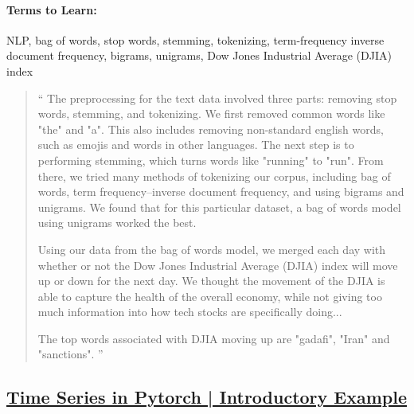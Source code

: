 \paragraph*{Terms to Learn: } NLP, bag of words, stop words, stemming, tokenizing, term-frequency inverse document frequency, bigrams, unigrams, Dow Jones Industrial Average (DJIA) index

\begin{quotation}
	`` The preprocessing for the text data involved three parts: removing stop words, stemming, and tokenizing. We first removed common words like "the" and "a". This also includes removing non-standard english words, such as emojis and words in other languages. The next step is to performing stemming, which turns words like "running" to "run". From there, we tried many methods of tokenizing our corpus, including bag of words, term frequency–inverse document frequency, and using bigrams and unigrams. We found that for this particular dataset, a bag of words model using unigrams worked the best.

	Using our data from the bag of words model, we merged each day with whether or not the Dow Jones Industrial Average (DJIA) index will move up or down for the next day. We thought the movement of the DJIA is able to capture the health of the overall economy, while not giving too much information into how tech stocks are specifically doing...

	The top words associated with DJIA moving up are "gadafi", "Iran" and "sanctions". ''
\end{quotation}


\subsection{\href{https://stackabuse.com/time-series-prediction-using-lstm-with-pytorch-in-python/}{Time Series in Pytorch | Introductory Example}}

